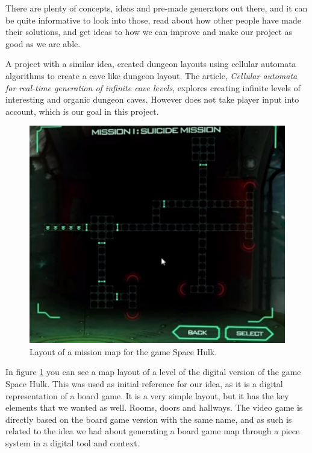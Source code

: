 \documentclass[conference,compsoc]{IEEEtran}
\begin{document}
There are plenty of concepts, ideas and pre-made generators out there, and it can be quite informative to look into those, read about how other people have made their solutions, and get ideas to how we can improve and make our project as good as we are able.

A project with a similar idea, created dungeon layouts using cellular automata algorithms to create a cave like dungeon layout. The article, \textit{Cellular automata for real-time generation of infinite cave levels}\cite{cellAto}, explores creating infinite levels of interesting and organic dungeon caves.
However does not take player input into account, which is our goal in this project.
\begin{figure}[h]
	\graphicspath{{figures/}}
	\includegraphics[width = \columnwidth ]{SpacehulkMap.png}
	\caption{Layout of a mission map for the game Space Hulk.}
	\label{fig:spacehulk}
\end{figure}

In figure \ref{fig:spacehulk} you can see a map layout of a level of the digital version of the game Space Hulk\cite{SpaceHulkvid}. This was used as initial reference for our idea, as it is a digital representation of a board game. It is a very simple layout, but it has the key elements that we wanted as well. Rooms, doors and hallways.
The video game is directly based on the board game version with the same name\cite{SpaceHulkBoard}, and as such is related to the idea we had about generating a board game map through a piece system in a digital tool and context. 
\end{document}
